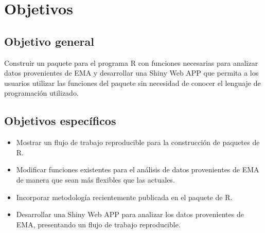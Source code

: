 \chapter{Objetivos}
\section{Objetivo general}

Construir un paquete para el programa R con funciones necesarias para analizar datos provenientes de EMA y desarrollar una Shiny Web APP que permita a los usuarios utilizar las funciones del paquete sin necesidad de conocer el lenguaje de programación utilizado.


\section{Objetivos específicos}
\begin{itemize}
\item Mostrar un flujo de trabajo reproducible para la construcción de paquetes de R.
\item Modificar funciones existentes para el análisis de datos provenientes de EMA de manera que sean más flexibles que las actuales.
\item Incorporar metodología recientemente publicada en el paquete de R.
\item Desarrollar una Shiny Web APP para analizar los datos provenientes de EMA, presentando un flujo de trabajo reproducible.
\end{itemize}

